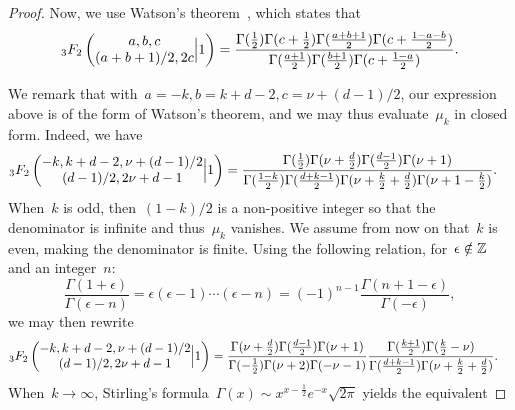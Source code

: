 \begin{proof}
Now, we use Watson's theorem~\citep[\eg,][Eq.~(1.4.12)]{ismail2005classical}, which states that
\begin{equation}
{}_{3}F_{2}\left(\begin{matrix}
		a,b,c \\ (a + b + 1)/2, 2c
	\end{matrix}\Big|1 \right) = \frac{\Gamma(\frac{1}{2}) \Gamma(c + \frac{1}{2}) \Gamma(\frac{a+b+1}{2}) \Gamma(c + \frac{1 - a - b}{2})}{\Gamma(\frac{a+1}{2})\Gamma(\frac{b+1}{2}) \Gamma(c + \frac{1-a}{2})}.
\end{equation}

We remark that with~$a=-k, b=k+d-2, c=\nu + (d-1)/2$, our expression above is of the form of Watson's theorem, and we may thus evaluate~$\mu_k$ in closed form.
Indeed, we have
\begin{align}
{}_{3}F_{2}\left(\begin{matrix}
		-k,k+d-2, \nu + (d-1)/2 \\ (d-1)/2, 2 \nu + d - 1
	\end{matrix}\Big| 1 \right)
	&= \frac{\Gamma(\frac{1}{2}) \Gamma(\nu + \frac{d}{2}) \Gamma(\frac{d-1}{2}) \Gamma(\nu + 1)}{\Gamma(\frac{1-k}{2}) \Gamma(\frac{d+k-1}{2}) \Gamma(\nu + \frac{k}{2} + \frac{d}{2}) \Gamma(\nu + 1 - \frac{k}{2})}.
\end{align}
When~$k$ is odd, then~$(1-k)/2$ is a non-positive integer so that the denominator is infinite and thus~$\mu_k$ vanishes. We assume from now on that~$k$ is even, making the denominator is finite.
Using the following relation, for~$\epsilon \notin {\mathbb Z}$ and an integer~$n$:
\begin{equation}
\frac{\Gamma(1+\epsilon)}{\Gamma(\epsilon - n)} = \epsilon(\epsilon-1) \cdots (\epsilon - n) = (-1)^{n-1} \frac{\Gamma(n+1- \epsilon)}{\Gamma(-\epsilon)},
\end{equation}
we may then rewrite
\begin{align}
{}_{3}F_{2}\left(\begin{matrix}
		-k,k+d-2, \nu + (d-1)/2 \\ (d-1)/2, 2 \nu + d - 1
	\end{matrix}\Big| 1 \right)
	&= \frac{\Gamma(\nu + \frac{d}{2}) \Gamma(\frac{d-1}{2}) \Gamma(\nu + 1)}{\Gamma(-\frac{1}{2}) \Gamma(\nu + 2) \Gamma(-\nu - 1)} \frac{\Gamma(\frac{k + 1}{2}) \Gamma(\frac{k}{2} - \nu) }{\Gamma(\frac{d+k-1}{2}) \Gamma(\nu + \frac{k}{2} + \frac{d}{2})}.
\end{align}
When~$k \to \infty$, Stirling's formula~$\Gamma(x) \sim x^{x - \frac{1}{2}} e^{-x} \sqrt{2 \pi}$ yields the equivalent

\end{proof}
